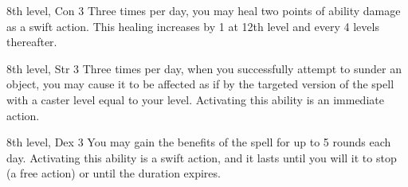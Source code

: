 \featpre 8th level, Con 3
\featben Three times per day, you may heal two points of ability damage as a swift action. This healing increases by 1 at 12th level and every 4 levels thereafter.

\featpre 8th level, Str 3
\featben Three times per day, when you successfully attempt to sunder an object, you may cause it to be affected as if by the targeted version of the  spell with a caster level equal to your level. Activating this ability is an immediate action.

\featpre 8th level, Dex 3
\featben You may gain the benefits of the  spell for up to 5 rounds each day. Activating this ability is a swift action, and it lasts until you will it to stop (a free action) or until the duration expires.
